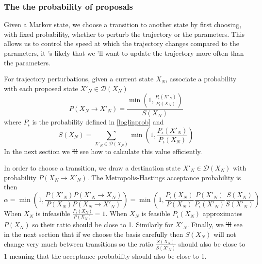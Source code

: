\documentclass{article}
\providecommand{\DIFaddtex}[1]{{\protect\color{blue}\uwave{#1}}} %
\providecommand{\DIFdeltex}[1]{{\protect\color{red}\sout{#1}}}                      %
\providecommand{\DIFaddbegin}{} %
\providecommand{\DIFaddend}{} %
\providecommand{\DIFdelbegin}{} %
\providecommand{\DIFdelend}{} %
\providecommand{\DIFadd}[1]{\texorpdfstring{\DIFaddtex{#1}}{#1}} %
\providecommand{\DIFdel}[1]{\texorpdfstring{\DIFdeltex{#1}}{}} %
\newcommand{\DIFscaledelfig}{0.5}
\newlength{\DIFdelgraphicswidth} %
\newlength{\DIFdelgraphicsheight} %
\newcommand{\DIFaddincludegraphics}[2][]{{\color{blue}\fbox{\DIFOincludegraphics[#1]{#2}}}} %
\newcommand{\DIFdelincludegraphics}[2][]{%
\sbox{\DIFdelgraphicsbox}{\DIFOincludegraphics[#1]{#2}}%
\settoboxwidth{\DIFdelgraphicswidth}{\DIFdelgraphicsbox} %
\settoboxtotalheight{\DIFdelgraphicsheight}{\DIFdelgraphicsbox} %
\scalebox{\DIFscaledelfig}{%
\parbox[b]{\DIFdelgraphicswidth}{\usebox{\DIFdelgraphicsbox}\\[-\baselineskip] \rule{\DIFdelgraphicswidth}{0em}}\llap{\resizebox{\DIFdelgraphicswidth}{\DIFdelgraphicsheight}{%
\setlength{\unitlength}{\DIFdelgraphicswidth}%
\begin{picture}(1,1)%
\thicklines\linethickness{2pt} %
{\color[rgb]{1,0,0}\put(0,0){\framebox(1,1){}}}%
{\color[rgb]{1,0,0}\put(0,0){\line( 1,1){1}}}%
{\color[rgb]{1,0,0}\put(0,1){\line(1,-1){1}}}%
\end{picture}%
}\hspace*{3pt}}} %
} %
\DeclareRobustCommand{\DIFaddbegin}{\DIFOaddbegin \let\includegraphics\DIFaddincludegraphics} %
\DeclareRobustCommand{\DIFaddend}{\DIFOaddend \let\includegraphics\DIFOincludegraphics} %
\DeclareRobustCommand{\DIFdelbegin}{\DIFOdelbegin \let\includegraphics\DIFdelincludegraphics} %
\DeclareRobustCommand{\DIFdelend}{\DIFOaddend \let\includegraphics\DIFOincludegraphics} %
\begin{document}
\subsubsection{The the probability of proposals}

Given a Markov state, we choose a transition to another state by first choosing, with fixed probability, whether to perturb the trajectory or the parameters. This allows us to control the speed at which the trajectory changes compared to the parameters, it \DIFdelbegin \DIFdel{'s }\DIFdelend \DIFaddbegin \DIFadd{is }\DIFaddend likely that we \DIFdelbegin \DIFdel{'ll }\DIFdelend \DIFaddbegin \DIFadd{will }\DIFaddend want to update the trajectory more often than the parameters.

For trajectory perturbations, given a current state $X_N$, associate a probability with each proposed state $X'_N \in \mathcal{D}(X_N)$
\begin{equation}
P(X_N \to X'_N) = \frac{\min\left(1, \frac{P_\iota(X'_N)}{P_\iota(X_N)}\right)}{S(X_N)} 
\label{transitionProb}
\end{equation}
where $P_\iota$ is the probability defined in \eqref{loglinprob} and
\begin{equation}
S(X_N) = \sum_{X'_N \in \mathcal{D}(X_N)} \min\left(1, \frac{P_\iota(X'_N)}{P_\iota(X_N)}\right)
\label{transitionSum}
\end{equation}
In the next section we \DIFdelbegin \DIFdel{'ll }\DIFdelend \DIFaddbegin \DIFadd{will }\DIFaddend see how to calculate this value efficiently.

In order to choose a transition, we draw a destination state $X'_N \in \mathcal{D}(X_N)$ with probability $P(X_N \to X'_N)$. The Metropolis-Hastings acceptance probability is then
\[
\alpha = 
\min\left( 1, \frac{P(X'_N)P(X'_N \to X_N)}{P(X_N)P(X_N \to X'_N)} \right) = \min\left(1, 
\frac{P_\iota(X_N)}{P(X_N)} \frac{P(X'_N)}{P_\iota(X'_N)}  \frac{S(X_N)}{S(X'_N)}\right)
\]
When $X_N$ is infeasible $\frac{P_\iota(X_N)}{P(X_N)} = 1$. When $X_N$ is feasible $P_\iota(X_N)$ approximates $P(X_N)$ so their ratio should be close to 1. Similarly for $X'_N$. Finally, we \DIFdelbegin \DIFdel{'ll }\DIFdelend \DIFaddbegin \DIFadd{will }\DIFaddend see in the next section that if we choose the basis carefully then $S(X_N)$ will not change very much between transitions so the ratio $ \frac{S(X_N)}{S(X'_N)}$ should also be close to 1 meaning that the acceptance probability should also be close to 1.
\end{document}

